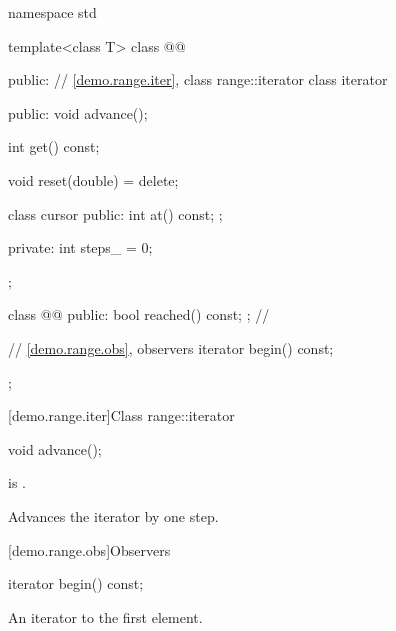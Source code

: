 \begin{codeblock}
namespace std {
  template<class T>
  class @@ {
  public:
    // \ref{demo.range.iter}, class range::iterator
    class iterator {
    public:
      void advance();

      int get() const;

      void reset(double) = delete;

      class cursor {
      public:
        int at() const;
      };

    private:
      int steps_ = 0;
    };

    class @@ {
    public:
      bool reached() const;
    }; // \expos

    // \ref{demo.range.obs}, observers
    iterator begin() const;
  };
}
\end{codeblock}

[demo.range.iter]{Class range::iterator}

%
\begin{itemdecl}
void advance();
\end{itemdecl}

\begin{itemdescr}
\pnum
\constraints
{} is .

\pnum
\effects
Advances the iterator by one step.
\end{itemdescr}

[demo.range.obs]{Observers}

%
\begin{itemdecl}
iterator begin() const;
\end{itemdecl}

\begin{itemdescr}
\pnum
\returns
An iterator to the first element.
\end{itemdescr}
